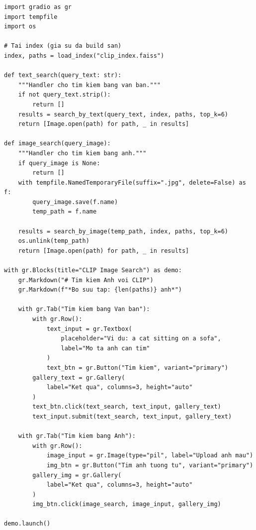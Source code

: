 \begin{verbatim}
import gradio as gr
import tempfile
import os

# Tai index (gia su da build san)
index, paths = load_index("clip_index.faiss")

def text_search(query_text: str):
    """Handler cho tim kiem bang van ban."""
    if not query_text.strip():
        return []
    results = search_by_text(query_text, index, paths, top_k=6)
    return [Image.open(path) for path, _ in results]

def image_search(query_image):
    """Handler cho tim kiem bang anh."""
    if query_image is None:
        return []
    with tempfile.NamedTemporaryFile(suffix=".jpg", delete=False) as f:
        query_image.save(f.name)
        temp_path = f.name

    results = search_by_image(temp_path, index, paths, top_k=6)
    os.unlink(temp_path)
    return [Image.open(path) for path, _ in results]

with gr.Blocks(title="CLIP Image Search") as demo:
    gr.Markdown("# Tim kiem Anh voi CLIP")
    gr.Markdown(f"*Bo suu tap: {len(paths)} anh*")

    with gr.Tab("Tim kiem bang Van ban"):
        with gr.Row():
            text_input = gr.Textbox(
                placeholder="Vi du: a cat sitting on a sofa",
                label="Mo ta anh can tim"
            )
            text_btn = gr.Button("Tim kiem", variant="primary")
        gallery_text = gr.Gallery(
            label="Ket qua", columns=3, height="auto"
        )
        text_btn.click(text_search, text_input, gallery_text)
        text_input.submit(text_search, text_input, gallery_text)

    with gr.Tab("Tim kiem bang Anh"):
        with gr.Row():
            image_input = gr.Image(type="pil", label="Upload anh mau")
            img_btn = gr.Button("Tim anh tuong tu", variant="primary")
        gallery_img = gr.Gallery(
            label="Ket qua", columns=3, height="auto"
        )
        img_btn.click(image_search, image_input, gallery_img)

demo.launch()
\end{verbatim}

